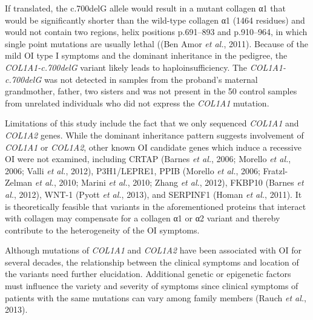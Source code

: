 \par If translated, the c.700delG allele would result in a mutant collagen α1 that would
                be significantly shorter than the wild-type collagen α1 (1464 residues) and would
                not contain two regions, helix positions p.691–893 and p.910–964, in which single
                point mutations are usually lethal ((Ben Amor
                        \textit{et al.}, 2011). Because of the mild OI type I
                symptoms and the dominant inheritance in the pedigree, the
                    \textit{COL1A1-c.700delG} variant likely leads to haploinsufficiency.
                The \textit{COL1A1-c.700delG} was not detected in samples from the proband’s
                maternal grandmother, father, two sisters and was not present in the 50 control
                samples from unrelated individuals who did not express the \textit{COL1A1}
                mutation.\par Limitations of this study include the fact that we only sequenced
                    \textit{COL1A1} and \textit{COL1A2} genes. While the dominant
                inheritance pattern suggests involvement of \textit{COL1A1} or
                    \textit{COL1A2}, other known OI candidate genes which induce a recessive
                OI were not examined, including CRTAP (Barnes
                        \textit{et al.}, 2006; Morello \textit{et al.}, 2006; Valli \textit{et al.}, 2012), P3H1/LEPRE1, PPIB (Morello \textit{et al.}, 2006; Fratzl-Zelman \textit{et al.}, 2010; Marini \textit{et al.}, 2010; Zhang \textit{et al.}, 2012), FKBP10
                    (Barnes \textit{et al.}, 2012),
                WNT-1 (Pyott \textit{et al.}, 2013),
                and SERPINF1 (Homan \textit{et al.},
                    2011). It is theoretically feasible that variants in the aforementioned
                proteins that interact with collagen may compensate for a collagen α1 or α2 variant
                and thereby contribute to the heterogeneity of the OI symptoms.\par Although mutations of \textit{COL1A1} and \textit{COL1A2} have been
                associated with OI for several decades, the relationship between the clinical
                symptoms and location of the variants need further elucidation. Additional genetic
                or epigenetic factors must influence the variety and severity of symptoms since
                clinical symptoms of patients with the same mutations can vary among family members
                    (Rauch \textit{et al.}, 2013).
